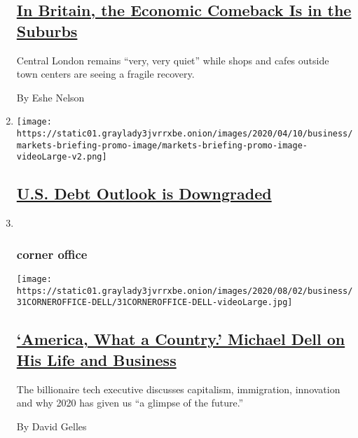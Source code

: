 \begin{enumerate}
  \hypertarget{in-britain-the-economic-comeback-is-in-the-suburbs}{%
  \subsection{\texorpdfstring{\href{/2020/07/31/business/britain-economic-comeback-suburbs.html}{In
  Britain, the Economic Comeback Is in the
  Suburbs}}{In Britain, the Economic Comeback Is in the Suburbs}}\label{in-britain-the-economic-comeback-is-in-the-suburbs}}

  Central London remains ``very, very quiet'' while shops and cafes
  outside town centers are seeing a fragile recovery.

  By Eshe Nelson
\item
  \texttt{[image: https://static01.graylady3jvrrxbe.onion/images/2020/04/10/business/markets-briefing-promo-image/markets-briefing-promo-image-videoLarge-v2.png]}

  \hypertarget{us-debt-outlook-is-downgraded}{%
  \subsection{\texorpdfstring{\href{https://www.nytimes3xbfgragh.onion/live/2020/07/31/business/stock-market-today-coronavirus}{U.S.
  Debt Outlook is
  Downgraded}}{U.S. Debt Outlook is Downgraded}}\label{us-debt-outlook-is-downgraded}}
\item ~
  \hypertarget{corner-office}{%
  \subsubsection{corner office}\label{corner-office}}

  \texttt{[image: https://static01.graylady3jvrrxbe.onion/images/2020/08/02/business/31CORNEROFFICE-DELL/31CORNEROFFICE-DELL-videoLarge.jpg]}

  \hypertarget{america-what-a-country-michael-dell-on-his-life-and-business}{%
  \subsection{\texorpdfstring{\href{/2020/07/31/business/michael-dell-corner-office.html}{`America,
  What a Country.' Michael Dell on His Life and
  Business}}{`America, What a Country.' Michael Dell on His Life and Business}}\label{america-what-a-country-michael-dell-on-his-life-and-business}}

  The billionaire tech executive discusses capitalism, immigration,
  innovation and why 2020 has given us ``a glimpse of the future.''

  By David Gelles
\end{enumerate}

